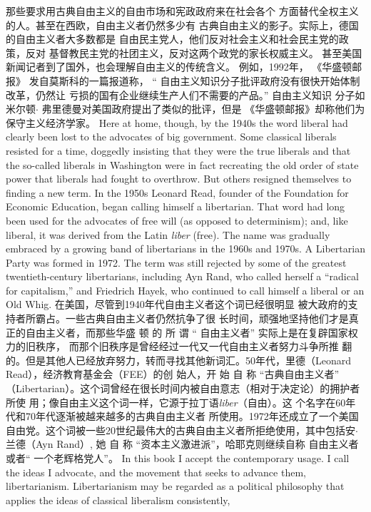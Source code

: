 \begin{paracol}{2}
那些要求用古典自由主义的自由市场和宪政政府来在社会各个
方面替代全权主义的人。甚至在西欧，自由主义者仍然多少有
古典自由主义的影子。实际上，德国的自由主义者大多数都是
自由民主党人，他们反对社会主义和社会民主党的政策，反对
基督教民主党的社团主义，反对这两个政党的家长权威主义。
甚至美国新闻记者到了国外，也会理解自由主义的传统含义。
例如，1992年， 《华盛顿邮报》 发自莫斯科的一篇报道称，
“ 自由主义知识分子批评政府没有很快开始体制改革，仍然让
亏损的国有企业继续生产人们不需要的产品。” 自由主义知识
分子如米尔顿$\cdot$ 弗里德曼对美国政府提出了类似的批评，但是
《华盛顿邮报》却称他们为保守主义经济学家。
\switchcolumn*
Here at home, though, by the 1940s the word liberal had
clearly been lost to the advocates of big government. Some classical liberals resisted for a time, doggedly insisting that they
were the true liberals and that the so-called liberals in Washington were in fact recreating the old order of state power that liberals had fought to overthrow. But others resigned themselves
to finding a new term. In the 1950s Leonard Read, founder of
the Foundation for Economic Education, began calling himself
a libertarian. That word had long been used for the advocates of
free will (as opposed to determinism); and, like liberal, it was
derived from the Latin \textit{liber} (free). The name was gradually embraced by a growing band of libertarians in the 1960s and
1970s. A Libertarian Party was formed in 1972. The term was
still rejected by some of the greatest twentieth-century libertarians, including Ayn Rand, who called herself a ``radical for capitalism,'' and Friedrich Hayek, who continued to call himself a
liberal or an Old Whig.
\switchcolumn
在美国，尽管到1940年代自由主义者这个词已经很明显
被大政府的支持者所霸占。一些古典自由主义者仍然抗争了很
长时间，顽强地坚持他们才是真正的自由主义者，而那些华盛
顿 的 所 谓 “ 自由主义者” 实际上是在复辟国家权力的旧秩序，
而那个旧秩序是曾经经过一代又一代自由主义者努力斗争所推
翻的。但是其他人已经放弃努力，转而寻找其他新词汇。50年代，里德（Leonard  Read），经济教育基金会（FEE）的创
始人，开 始 自 称 “古典自由主义者” （Libertarian）。这个词曾经在很长时间内被自由意志（相对于决定论）的拥护者所使
用；像自由主义这个词一样，它源于拉丁语\textit{liber}（自由）。这
个名字在60年代和70年代逐渐被越来越多的古典自由主义者
所使用。1972年还成立了一个美国自由党。这个词被一些20世纪最伟大的古典自由主义者所拒绝使用，其中包括安$\cdot$兰德（Ayn Rand）, 她 自 称 “资本主义激进派”，哈耶克则继续自称
自由主义者或者“ 一个老辉格党人”。
\switchcolumn*
In this book I accept the contemporary usage. I call the ideas
I advocate, and the movement that seeks to advance them, libertarianism. Libertarianism may be regarded as a political philosophy that applies the ideas of classical liberalism consistently,

\end{paracol}
